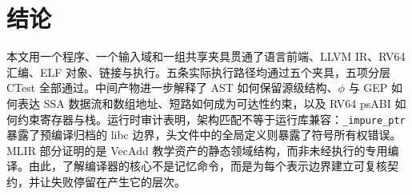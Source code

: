 \section{结论}
\label{sec:conclusion}

本文用一个程序、一个输入域和一组共享夹具贯通了语言前端、LLVM IR、RV64 汇编、ELF 对象、链接与执行。五条实际执行路径均通过五个夹具，五项分层 CTest 全部通过。中间产物进一步解释了 AST 如何保留源级结构、$\phi$ 与 GEP 如何表达 SSA 数据流和数组地址、短路如何成为可达性约束，以及 RV64 psABI 如何约束寄存器与栈。运行时审计表明，架构匹配不等于运行库兼容：\texttt{\_impure\_ptr} 暴露了预编译归档的 libc 边界，头文件中的全局定义则暴露了符号所有权错误。MLIR 部分证明的是 VecAdd 教学资产的静态领域结构，而非未经执行的专用编译。由此，了解编译器的核心不是记忆命令，而是为每个表示边界建立可复核契约，并让失败停留在产生它的层次。
